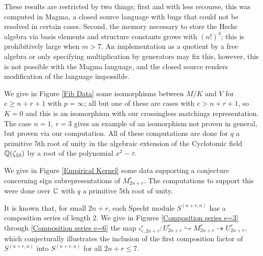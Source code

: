 \documentclass{amsart}
\begin{document}
\begin{remark}
  These results are restricted by two things; first and with less recourse, this was computed in Magma, a closed source language with bugs that could not be resolved in certain cases.
  Second, the memory necessary to store the Hecke algebra via basis elements and structure constants grows with $(n!)^3$;
  this is prohibitively large when $m > 7$.
  An implementation as a quotient by a free algebra or only specifying multiplication by generators may fix this, however, this is not possible with the Magma language, and the closed source renders modification of the language impossible.
\end{remark}

We give in Figure \ref{Fib Data} some isomorphisms between $M/K$ and $V$ for $e \geq n + r + 1$ with $p = \infty$;
all but one of these are cases with $e > n + r + 1$, so $K=0$ and this is an isomorphism with our crossingless matchings representation.
The case $n = 1$, $r = 3$ gives an example of an isomorphism not proven in general, but proven via our computation.
All of these computations are done for $q$ a primitive 5th root of unity in the algebraic extension of the Cyclotomic field $\mathbb{Q}(\zeta_{10})$ by a root of the polynomial $x^2 - \tau$.

We give in Figure \ref{Empirical Kernel} some data supporting a conjecture concerning sign subrepresentations of $M_{2n + r}^r$.
The computations to support this were done over $\mathbb{C}$ with $q$ a primitive 5th root of unity.

It is known that, for small $2n + r$, each Specht module $S^{(n+r,n)}$ has a composition series of length 2.\cite{Mathas-book}
We give in Figures \ref{Composition series e=3} through \ref{Composition series e=6} the map $\iota_{e,2n+r}^r:U_{2n + r}^r \hookrightarrow M_{2n + r}^r \twoheadrightarrow U_{2n + r}^r$, which conjecturally illustrates the inclusion of the first composition factor of $S^{(n+r,n)}$ into $S^{(n+r,n)}$ for all $2n + r \leq 7$.


 
 
\end{document}
